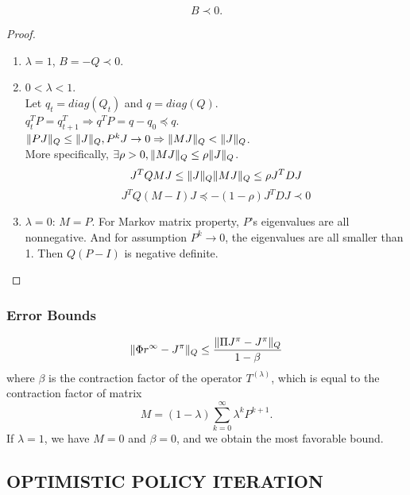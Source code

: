 \begin{lemma}
    \[
        B \prec 0.
    \]
    \begin{proof}
        \begin{enumerate}
            \item $ \lambda = 1 $, $ B = -Q \prec 0 $.
            \item $ 0 < \lambda < 1 $.\\
                Let $ q_t = diag(Q_t) $ and $ q = diag(Q) $.\\
                $ q^T_{t} P = q^{T}_{t+1} \Rightarrow  q^{T} P = q - q_0 \preceq q$.\\
                $ \Arrowvert P J \Arrowvert_{Q} \le \Arrowvert J \Arrowvert_Q, P^{k}J \rightarrow 0 \Rightarrow \Arrowvert M J \Arrowvert_Q < \Arrowvert J \Arrowvert_Q $. \\
                More specifically, $ \exists \rho > 0, \Arrowvert MJ \Arrowvert_{Q} \le \rho \Arrowvert J \Arrowvert_Q $.
                \[
                    J^T Q M J \le \Arrowvert J \Arrowvert_Q \Arrowvert M J \Arrowvert_Q \le \rho J^T D J
                \]
                \[
                    J^T Q (M-I) J \preceq -(1 - \rho) J^T D J \prec 0
                \]
            \item $ \lambda = 0 $: $ M = P $.
                For Markov matrix property, $ P $'s eigenvalues are all nonnegative. And for assumption $ P^{k} \rightarrow 0 $, the eigenvalues are all smaller than 1. Then $ Q(P - I) $ is negative definite.
        \end{enumerate}
    \end{proof}
\end{lemma}

\subsubsection*{Error Bounds}%

\[
    \Arrowvert \Phi r^{\infty} - J^{\pi} \Arrowvert_Q \le \frac{ \Arrowvert \Pi J^{\pi} - J^{\pi} \Arrowvert_{Q}}{ 1 - \beta } 
\]
where $ \beta $ is the contraction factor of the operator $ T^{(\lambda)} $, which is equal to the contraction factor of matrix
\[
    M = (1 - \lambda) \sum^{\infty}_{k = 0} \lambda^{k} P^{k+1}.
\]
If $ \lambda = 1 $, we have $ M = 0 $ and $ \beta = 0 $, and we obtain the most favorable bound.

\subsection{OPTIMISTIC POLICY ITERATION}%
\label{sub:optimistic_policy_iteration}


